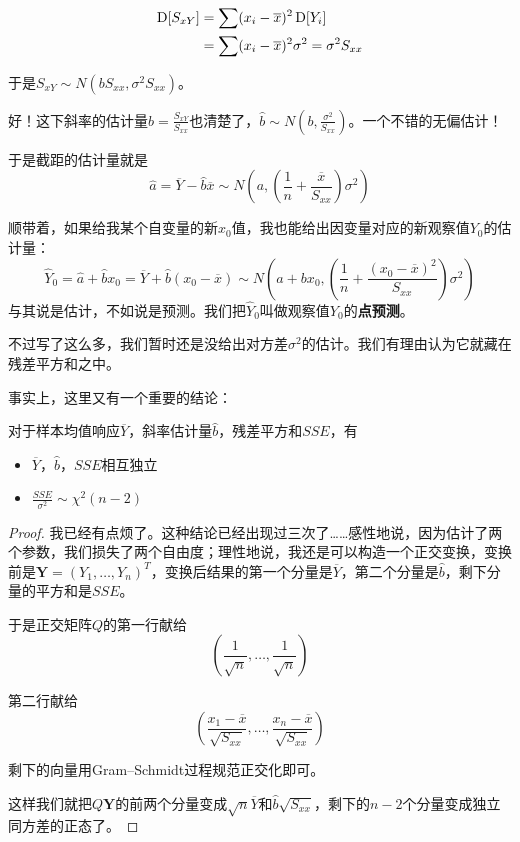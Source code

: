 \begin{align*}
\operatorname{D}[S_{xY}] &= \sum (x_i-\overline{x})^2\operatorname{D}[Y_i]\\
&=\sum (x_i-\overline{x})^2\sigma^2=\sigma^2S_{xx}
\end{align*}

于是$S_{xY}\sim N(bS_{xx},\sigma^2S_{xx})$。

好！这下斜率的估计量$\hat{b}=\frac{S_{xY}}{S_{xx}}$也清楚了，$\hat{b}\sim N(b,\frac{\sigma^2}{S_{xx}})$。一个不错的无偏估计！

于是截距的估计量就是
\[
\hat{a}=\overline{Y}-\hat{b}\overline{x}\sim N\left(a,\left(\frac{1}{n}+\frac{\overline{x}}{S_{xx}}\right)\sigma^2\right)
\]

顺带着，如果给我某个自变量的新$x_0$值，我也能给出因变量对应的新观察值$Y_0$的估计量：
\[
\hat{Y}_0=\hat{a} +\hat{b}x_0=\overline{Y}+\hat{b}(x_0-\overline{x}) \sim N\left(a+bx_0,\left(\frac{1}{n}+\frac{(x_0-\overline{x})^2}{S_{xx}}\right)\sigma^2\right)
\]
与其说是估计，不如说是预测。我们把$\hat{Y}_0$叫做观察值$Y_0$的\textbf{点预测}。

不过写了这么多，我们暂时还是没给出对方差$\sigma^2$的估计。我们有理由认为它就藏在残差平方和之中。

事实上，这里又有一个重要的结论：
\begin{theorem}
对于样本均值响应$\overline{Y}$，斜率估计量$\hat{b}$，残差平方和$SSE$，有
\begin{itemize}
    \item $\overline{Y}$，$\hat{b}$，$SSE$相互独立
    \item $\frac{SSE}{\sigma^2} \sim \chi^2(n-2)$
\end{itemize}
\end{theorem}

\begin{proof}
我已经有点烦了。这种结论已经出现过三次了……感性地说，因为估计了两个参数，我们损失了两个自由度；理性地说，我还是可以构造一个正交变换，变换前是$\mathbf{Y}=(Y_1,\ldots,Y_n)^T$，变换后结果的第一个分量是$\overline{Y}$，第二个分量是$\hat{b}$，剩下分量的平方和是$SSE$。

于是正交矩阵$Q$的第一行献给
\[
\left(\frac{1}{\sqrt{n}},\ldots,\frac{1}{\sqrt{n}}\right)
\]

第二行献给
\[
\left(\frac{x_1-\overline{x}}{\sqrt{S_{xx}}},\ldots,\frac{x_n-\overline{x}}{\sqrt{S_{xx}}}\right)
\]

剩下的向量用Gram--Schmidt过程规范正交化即可。

这样我们就把$Q\mathbf{Y}$的前两个分量变成$\sqrt{n}\overline{Y}$和$\hat{b}\sqrt{S_{xx}}$，剩下的$n-2$个分量变成独立同方差的正态了。
\end{proof}

